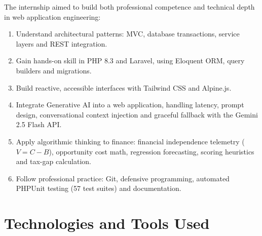 \documentclass[12pt,a4paper]{report}
\begin{document}
The internship aimed to build both professional competence and technical depth in web application engineering:
\begin{enumerate}[leftmargin=*]
    \item Understand architectural patterns: MVC, database transactions, service layers and REST integration.
    \item Gain hands-on skill in PHP 8.3 and Laravel, using Eloquent ORM, query builders and migrations.
    \item Build reactive, accessible interfaces with Tailwind CSS and Alpine.js.
    \item Integrate Generative AI into a web application, handling latency, prompt design, conversational context injection and graceful fallback with the Gemini 2.5 Flash API.
    \item Apply algorithmic thinking to finance: financial independence telemetry ($V = C - B$), opportunity cost math, regression forecasting, scoring heuristics and tax-gap calculation.
    \item Follow professional practice: Git, defensive programming, automated PHPUnit testing (57 test suites) and documentation.
\end{enumerate}


\section{Technologies and Tools Used}\label{s32}
\end{document}
